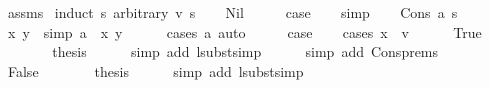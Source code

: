 \begin{isabellebody}
%
\isadelimproof
%
\endisadelimproof
%
\isatagproof
{}\isamarkupfalse%
\ assms\isanewline
{}\isamarkupfalse%
\ {\isacharparenleft}{\kern0pt}induct\ s\ arbitrary{\isacharcolon}{\kern0pt}\ v\ s{}{\isacharparenright}{\kern0pt}\isanewline
\ \ \isamarkupfalse%
\ Nil\isanewline
\ \ \isamarkupfalse%
\ \isamarkupfalse%
\ {\isacharquery}{\kern0pt}case\isanewline
\ \ \isamarkupfalse%
\ simp\isanewline
{}\isamarkupfalse%
\isanewline
\ \ \isamarkupfalse%
\ {\isacharparenleft}{\kern0pt}Cons\ a\ s{\isacharparenright}{\kern0pt}\isanewline
\ \ \isamarkupfalse%
\ x\ y\ \ {\isacharbrackleft}{\kern0pt}simp{\isacharbrackright}{\kern0pt}{\isacharcolon}{\kern0pt}\ {\isachardoublequoteopen}a\ {\isacharequal}{\kern0pt}\ {\isacharparenleft}{\kern0pt}x{\isacharcomma}{\kern0pt}\ y{\isacharparenright}{\kern0pt}{\isachardoublequoteclose}\isanewline
\ \ \ \ \isamarkupfalse%
\ {\isacharparenleft}{\kern0pt}cases\ a{\isacharparenright}{\kern0pt}\ auto\isanewline
\isanewline
\ \ \isamarkupfalse%
\ \isamarkupfalse%
\ {\isacharquery}{\kern0pt}case\isanewline
\ \ \isamarkupfalse%
\ {\isacharparenleft}{\kern0pt}cases\ {\isachardoublequoteopen}x\ {\isacharequal}{\kern0pt}\ v{\isachardoublequoteclose}{\isacharparenright}{\kern0pt}\isanewline
\ \ \ \ \isamarkupfalse%
\ True\isanewline
\ \ \ \ \isamarkupfalse%
\ \isamarkupfalse%
\ {\isacharquery}{\kern0pt}thesis\isanewline
\ \ \ \ \isamarkupfalse%
\ {\isacharparenleft}{\kern0pt}simp\ add{\isacharcolon}{\kern0pt}\ lsubst{\isacharunderscore}{\kern0pt}simp{\isacharparenright}{\kern0pt}\isanewline
\ \ \ \ \isamarkupfalse%
\ {\isacharparenleft}{\kern0pt}simp\ add{\isacharcolon}{\kern0pt}\ Cons{\isachardot}{\kern0pt}prems{\isacharparenleft}{\kern0pt}{}{\isacharcomma}{\kern0pt}{}{\isacharparenright}{\kern0pt}{\isacharparenright}{\kern0pt}\isanewline
\ \ \isamarkupfalse%
\isanewline
\ \ \ \ \isamarkupfalse%
\ False\isanewline
\ \ \ \ \isamarkupfalse%
\ \isamarkupfalse%
\ {\isacharquery}{\kern0pt}thesis\isanewline
\ \ \ \ \isamarkupfalse%
\ {\isacharparenleft}{\kern0pt}simp\ add{\isacharcolon}{\kern0pt}\ lsubst{\isacharunderscore}{\kern0pt}simp{\isacharparenright}{\kern0pt}\isanewline

\end{isabellebody}
